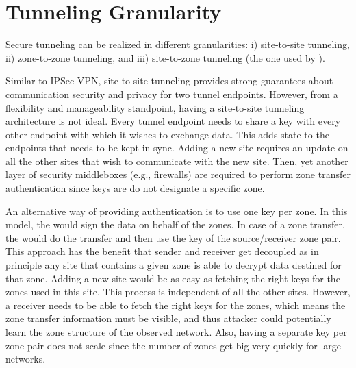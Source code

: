 \section{Tunneling Granularity} %
\label{sec:granularity}
Secure tunneling can be realized in different granularities: i) site-to-site tunneling, 
ii) zone-to-zone tunneling, and iii) site-to-zone tunneling (the one used by \name). 

Similar to IPSec VPN, site-to-site tunneling provides strong guarantees about communication
security and privacy for two tunnel endpoints.
However, from a flexibility and manageability standpoint, having a site-to-site tunneling 
architecture is not ideal. Every tunnel endpoint needs to share a key with every other 
endpoint with which it wishes to exchange data. This adds state to the endpoints that
needs to be kept in sync. Adding a new site requires an update on all the other sites that 
wish to communicate with the new site. Then, yet another layer of security middleboxes (e.g., firewalls) are required to perform zone transfer authentication since keys are do not designate a specific zone.

An alternative way of providing authentication is to use one key per zone. In this model, 
the \tp would sign the data on behalf of the zones. In case of a zone transfer, the \tp 
would do the transfer and then use the key of the source/receiver zone pair. This approach 
has the benefit that sender and receiver get decoupled as in principle any site that 
contains a given zone is able to decrypt data destined for that zone. Adding a new site 
would be as easy as fetching the right keys for the zones used in this site. This process 
is independent of all the other sites. However, a receiver \tp needs to be able to fetch
the right keys for the zones, which means the zone transfer information must be visible, 
and thus attacker could potentially learn the zone structure of the observed network. 
Also, having a separate key per zone pair does not scale since the number of zones get big 
very quickly for large networks.

